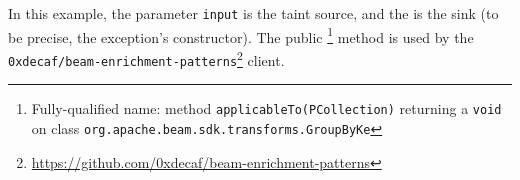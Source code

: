 



In this example, the parameter \texttt{input} is the taint source, and the \texttt{} is the sink (to be precise, the exception's constructor). The public \texttt{}\footnote{Fully-qualified name: method \texttt{applicableTo(PCollection)} returning a \texttt{void} on class \texttt{org.apache.beam.sdk.transforms.GroupByKe}} method is used by the \texttt{0xdecaf/beam-enrichment-patterns}\footnote{\url{https://github.com/0xdecaf/beam-enrichment-patterns}} client.



